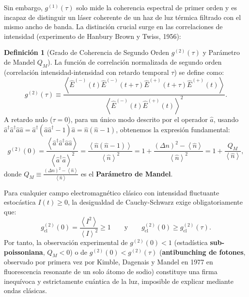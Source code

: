 \documentclass[11pt,a4paper,twoside]{report}
\theoremstyle{definition}
\newtheorem{definicion}{Definición}[chapter]
\theoremstyle{plain}
\theoremstyle{remark}
\newcommand{\expval}[1]{\left\langle #1 \right\rangle}
\newcommand{\op}[1]{\hat{#1}}
\begin{document}
Sin embargo, $g^{(1)}(\tau)$ solo mide la coherencia espectral de primer orden y es incapaz de distinguir un láser coherente de un haz de luz térmica filtrado con el mismo ancho de banda. La distinción crucial surge en las correlaciones de intensidad (experimento de Hanbury Brown y Twiss, 1956):

\begin{definicion}[Grado de Coherencia de Segundo Orden $g^{(2)}(\tau)$ y Parámetro de Mandel $Q_M$]
La función de correlación normalizada de segundo orden (correlación intensidad-intensidad con retardo temporal $\tau$) se define como:
\begin{equation}
    g^{(2)}(\tau) \equiv \frac{\expval{\op{E}^{(-)}(t)\op{E}^{(-)}(t+\tau)\op{E}^{(+)}(t+\tau)\op{E}^{(+)}(t)}}{\expval{\op{E}^{(-)}(t)\op{E}^{(+)}(t)}^2}.
\end{equation}
A retardo nulo ($\tau = 0$), para un único modo descrito por el operador $\op{a}$, usando $\op{a}^\dagger\op{a}^\dagger\op{a}\op{a} = \op{a}^\dagger(\op{a}\op{a}^\dagger - 1)\op{a} = \op{n}(\op{n}-1)$, obtenemos la expresión fundamental:
\begin{equation}
    g^{(2)}(0) = \frac{\expval{\op{a}^\dagger\op{a}^\dagger\op{a}\op{a}}}{\expval{\op{a}^\dagger\op{a}}^2} = \frac{\expval{\op{n}(\op{n}-1)}}{\expval{\op{n}}^2} = 1 + \frac{(\Delta n)^2 - \expval{\op{n}}}{\expval{\op{n}}^2} = 1 + \frac{Q_M}{\expval{\op{n}}},
\end{equation}
donde $Q_M \equiv \frac{(\Delta n)^2 - \expval{\op{n}}}{\expval{\op{n}}}$ es el \textbf{Parámetro de Mandel}.
\end{definicion}

Para cualquier campo electromagnético clásico con intensidad fluctuante estocástica $I(t) \ge 0$, la desigualdad de Cauchy-Schwarz exige obligatoriamente que:
\begin{equation}
    g^{(2)}_{\text{cl}}(0) = \frac{\expval{I^2}}{\expval{I}^2} \ge 1 \qquad \text{y} \qquad g^{(2)}_{\text{cl}}(0) \ge g^{(2)}_{\text{cl}}(\tau).
\end{equation}
Por tanto, la observación experimental de $g^{(2)}(0) < 1$ (estadística \textbf{sub-poissoniana}, $Q_M < 0$) o de $g^{(2)}(0) < g^{(2)}(\tau)$ (\textbf{antibunching de fotones}, observado por primera vez por Kimble, Dagenais y Mandel en 1977 en fluorescencia resonante de un solo átomo de sodio) constituye una firma inequívoca y estrictamente cuántica de la luz, imposible de explicar mediante ondas clásicas.
\end{document}
